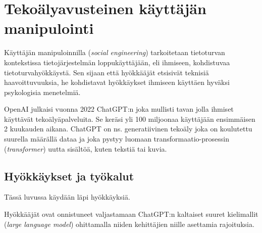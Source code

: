 


\chapter*{Tekoälyavusteinen käyttäjän\\manipulointi\label{chapter:finnish}}
\begin{comment}

Tekoälyä hyödyntävä käyttäjän manipulointi
Teokälypohjainen käyttäjän manipulointi
Tekoälyavusteinen käyttäjän manipulointi

Pyydä Riinalta ym palautetta kieliopin tarkistuksessa! Opin samalla itse. Riinahan voi tarkistaa esim tätä .tex tiedostoa GitHubista? Tai PDF kumpi vaan hänelle parempi, mutta PDF:n kassa pitää muistaa aina päivittää se Overleafiin ja sitten GitHubiin.

Ohjeet:
    - 4 or 5 sivua
    - TOC ja Chapter 1 Introduction väliin

Kappaleet:
    - (ilman nimeä sisältää Introduction ja Definition kappaleet)
    - Hyökkäykset ja työkalut
    - Puolustuskeinot
    - Puolustuskeinojen arviointia
    - Yhteenveto
    - EI Overleaf kappalenumerointia? Kappale "0"?
    

\end{comment}


Käyttäjän manipuloinnilla (\textit{social engineering}) tarkoitetaan tietoturvan kontekstissa tietojärjestelmän loppukäyttäjään, eli ihmiseen, kohdistuvaa tietoturvahyökkäystä. Sen sijaan että hyökkääjät etsisivät teknisiä haavoittuvuuksia, he kohdistavat hyökkäykset ihmiseen käyttäen hyväksi psykologisia menetelmiä.

OpenAI julkaisi vuonna 2022 ChatGPT:n joka mullisti tavan jolla ihmiset käyttävät tekoälyäpalveluita. Se keräsi yli 100 miljoonaa käyttäjään ensimmäisen 2 kuukauden aikana. ChatGPT on ns. generatiivinen tekoäly joka on koulutettu suurella määrällä dataa ja joka pystyy luomaan transformaatio-prosessin (\textit{transformer}) uutta sisältöä, kuten tekstiä tai kuvia.

\section*{Hyökkäykset ja työkalut}

Tässä luvussa käydään läpi hyökkäyksiä.

Hyökkääjät ovat onnistuneet valjastamaan ChatGPT:n kaltaiset suuret kielimallit (\textit{large language model}) ohittamalla niiden kehittäjien niille asettamia rajoituksia.

